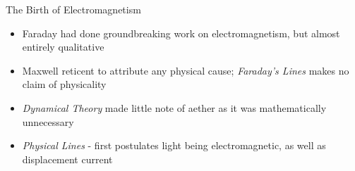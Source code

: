 \documentclass{beamer}
\begin{document}
\begin{frame}{The Birth of Electromagnetism}
	\begin{itemize}
		\item Faraday had done groundbreaking work on electromagnetism, but almost entirely qualitative
		\item Maxwell reticent to attribute any physical cause; \emph{Faraday's Lines}{\only \autocite{maxfaradaylines}} makes no claim of physicality
		\item \emph{Dynamical Theory}\autocite{maxdynamicaltheory} made little note of aether as it was mathematically unnecessary
		\item \emph{Physical Lines}{ \autocite{maxphysicallines}} - first postulates light being electromagnetic, as well as displacement current
	\end{itemize}
\end{frame}
\end{document}
